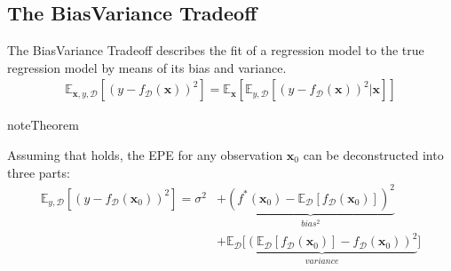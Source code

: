\documentclass[letterpaper,10pt,english]{jupyterBook}
\begin{document}
\subsection{The Bias\sphinxhyphen{}Variance Tradeoff}
\label{\detokenize{regression_bias_var:id1}}
\sphinxAtStartPar
The Bias\sphinxhyphen{}Variance Tradeoff describes the fit of a regression model to the true regression model by means of its bias and variance.
\begin{equation*}
\begin{split} \mathbb{E}_{\mathbf{x},y,\mathcal{D}}[(y-f_\mathcal{D}(\mathbf{x}))^2]=\mathbb{E}_\mathbf{x}[\mathbb{E}_{y,\mathcal{D}}[(y-f_\mathcal{D}(\mathbf{x}))^2\vert \mathbf{x}]]\end{split}
\end{equation*}
\label{None:theorem-2}
\begin{sphinxadmonition}{note}{Theorem }



\sphinxAtStartPar
Assuming that {\hyperref[\detokenize{regression_bias_var:prop:target_distr}]{}} holds, the EPE for any observation \(\mathbf{x}_0\) can be deconstructed into three parts:
\begin{align*}
    \mathbb{E}_{y,\mathcal{D}}[(y-f_\mathcal{D}(\mathbf{x}_0))^2]  
    = \sigma^2 &+\underbrace{(f^*(\mathbf{x}_0)-\mathbb{E}_\mathcal{D}[f_\mathcal{D}(\mathbf{x}_0)])^2}_{bias^2}\\ &+\underbrace{\mathbb{E}_\mathcal{D}[(\mathbb{E}_\mathcal{D}[f_\mathcal{D}(\mathbf{x}_0)]-f_\mathcal{D}(\mathbf{x}_0))^2}_{variance}] 
\end{align*}\end{sphinxadmonition}
\end{document}
